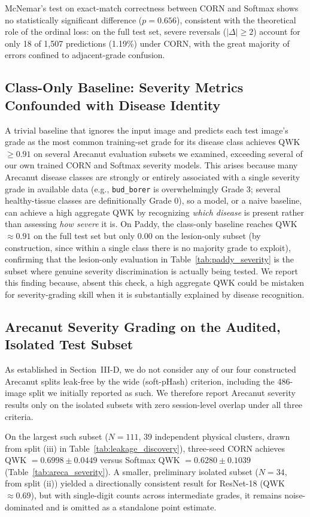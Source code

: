 \documentclass[conference]{IEEEtran}
\begin{document}
McNemar's test on exact-match correctness between CORN and Softmax shows no statistically significant difference ($p=0.656$), consistent with the theoretical role of the ordinal loss: on the full test set, severe reversals ($|\Delta|\ge2$) account for only 18 of 1,507 predictions (1.19\%) under CORN, with the great majority of errors confined to adjacent-grade confusion.

\subsection{Class-Only Baseline: Severity Metrics Confounded with Disease Identity}
A trivial baseline that ignores the input image and predicts each test image's grade as the most common training-set grade for its disease class achieves QWK $\ge 0.91$ on several Arecanut evaluation subsets we examined, exceeding several of our own trained CORN and Softmax severity models. This arises because many Arecanut disease classes are strongly or entirely associated with a single severity grade in available data (e.g., \texttt{bud\_borer} is overwhelmingly Grade 3; several healthy-tissue classes are definitionally Grade 0), so a model, or a naive baseline, can achieve a high aggregate QWK by recognizing \emph{which disease} is present rather than assessing \emph{how severe} it is. On Paddy, the class-only baseline reaches QWK $\approx 0.91$ on the full test set but only $0.00$ on the lesion-only subset (by construction, since within a single class there is no majority grade to exploit), confirming that the lesion-only evaluation in Table~\ref{tab:paddy_severity} is the subset where genuine severity discrimination is actually being tested. We report this finding because, absent this check, a high aggregate QWK could be mistaken for severity-grading skill when it is substantially explained by disease recognition.

\subsection{Arecanut Severity Grading on the Audited, Isolated Test Subset}
As established in Section~III-D, we do not consider any of our four constructed Arecanut splits leak-free by the wide (soft-pHash) criterion, including the 486-image split we initially reported as such. We therefore report Arecanut severity results only on the isolated subsets with zero session-level overlap under all three criteria.

On the largest such subset ($N=111$, 39 independent physical clusters, drawn from split (iii) in Table~\ref{tab:leakage_discovery}), three-seed CORN achieves QWK $=0.6998\pm0.0449$ versus Softmax QWK $=0.6280\pm0.1039$ (Table~\ref{tab:areca_severity}). A smaller, preliminary isolated subset ($N=34$, from split (ii)) yielded a directionally consistent result for ResNet-18 (QWK $\approx 0.69$), but with single-digit counts across intermediate grades, it remains noise-dominated and is omitted as a standalone point estimate.
\end{document}
